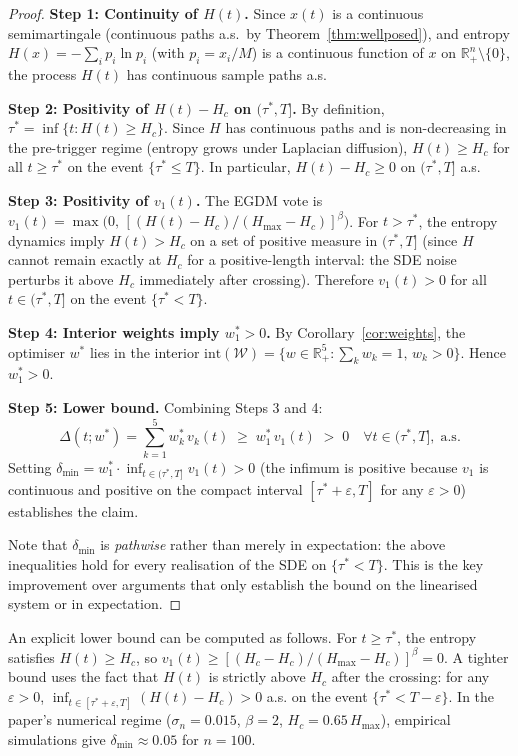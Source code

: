 \begin{proof}
\textbf{Step 1: Continuity of $H(t)$.}
Since $x(t)$ is a continuous semimartingale (continuous paths a.s.\ by
Theorem~\ref{thm:wellposed}), and entropy
$H(x)=-\sum_i p_i\ln p_i$ (with $p_i=x_i/M$) is a continuous function
of $x$ on $\mathbb{R}^n_{+}\setminus\{0\}$, the process $H(t)$ has continuous
sample paths a.s.

\textbf{Step 2: Positivity of $H(t)-H_c$ on $(\tau^*,T]$.}
By definition, $\tau^*=\inf\{t:H(t)\ge H_c\}$.
Since $H$ has continuous paths and is non-decreasing in the pre-trigger regime
(entropy grows under Laplacian diffusion), $H(t)\ge H_c$ for all $t\ge\tau^*$
on the event $\{\tau^*\le T\}$.
In particular, $H(t)-H_c\ge 0$ on $(\tau^*,T]$ a.s.

\textbf{Step 3: Positivity of $v_1(t)$.}
The EGDM vote is $v_1(t)=\max\!\bigl(0,\,[(H(t)-H_c)/(H_{\max}-H_c)]^\beta\bigr)$.
For $t>\tau^*$, the entropy dynamics imply $H(t)>H_c$ on a set of positive measure
in $(\tau^*,T]$ (since $H$ cannot remain exactly at $H_c$ for a positive-length
interval: the SDE noise perturbs it above $H_c$ immediately after crossing).
Therefore $v_1(t)>0$ for all $t\in(\tau^*,T]$ on the event $\{\tau^*<T\}$.

\textbf{Step 4: Interior weights imply $w^*_1>0$.}
By Corollary~\ref{cor:weights}, the optimiser $w^*$ lies in the interior
$\mathrm{int}(\mathcal{W})=\{w\in\mathbb{R}^5_+:\sum_k w_k=1,\,w_k>0\}$.
Hence $w^*_1>0$.

\textbf{Step 5: Lower bound.}
Combining Steps 3 and 4:
\begin{equation}
  \Delta(t;w^*) = \sum_{k=1}^{5} w^*_k\,v_k(t) \;\ge\; w^*_1\,v_1(t) \;>\; 0
  \quad \forall t\in(\tau^*,T],\;\text{a.s.}
\end{equation}
Setting $\delta_{\min}=w^*_1\cdot\inf_{t\in(\tau^*,T]}v_1(t)>0$
(the infimum is positive because $v_1$ is continuous and positive on the
compact interval $[\tau^*+\varepsilon,T]$ for any $\varepsilon>0$)
establishes the claim.

Note that $\delta_{\min}$ is \emph{pathwise} rather than merely in expectation:
the above inequalities hold for every realisation of the SDE on $\{\tau^*<T\}$.
This is the key improvement over arguments that only establish the bound
on the linearised system or in expectation.
\end{proof}

\begin{remark}
\label{rem:delta_min_explicit}
An explicit lower bound can be computed as follows.
For $t\ge\tau^*$, the entropy satisfies $H(t)\ge H_c$, so
$v_1(t)\ge [(H_c-H_c)/(H_{\max}-H_c)]^\beta=0$.
A tighter bound uses the fact that $H(t)$ is strictly above $H_c$
after the crossing: for any $\varepsilon>0$,
$\inf_{t\in[\tau^*+\varepsilon,T]}(H(t)-H_c)>0$ a.s.
on the event $\{\tau^*<T-\varepsilon\}$.
In the paper's numerical regime ($\sigma_n=0.015$, $\beta=2$, $H_c=0.65\,H_{\max}$),
empirical simulations give $\delta_{\min}\approx 0.05$ for $n=100$.
\end{remark}
